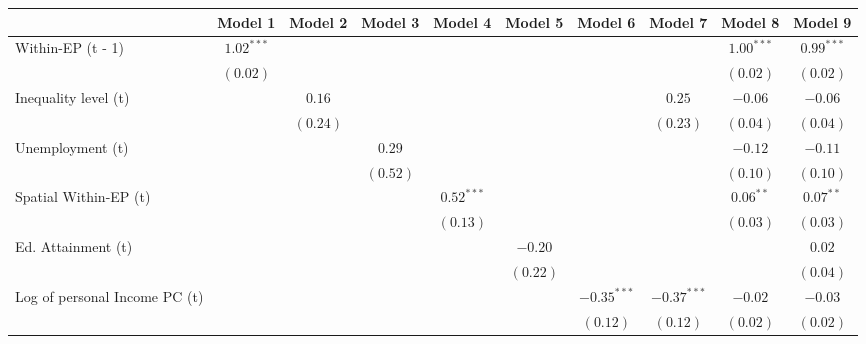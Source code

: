 
\begin{table}
\begin{center}
\begin{tabular}{l c c c c c c c c c}
\hline
 & Model 1 & Model 2 & Model 3 & Model 4 & Model 5 & Model 6 & Model 7 & Model 8 & Model 9 \\
\hline
Within-EP (t - 1)             & $1.02^{***}$ &          &          &              &          &               &               & $1.00^{***}$ & $0.99^{***}$ \\
                              & $(0.02)$     &          &          &              &          &               &               & $(0.02)$     & $(0.02)$     \\
Inequality level (t)          &              & $0.16$   &          &              &          &               & $0.25$        & $-0.06$      & $-0.06$      \\
                              &              & $(0.24)$ &          &              &          &               & $(0.23)$      & $(0.04)$     & $(0.04)$     \\
Unemployment (t)              &              &          & $0.29$   &              &          &               &               & $-0.12$      & $-0.11$      \\
                              &              &          & $(0.52)$ &              &          &               &               & $(0.10)$     & $(0.10)$     \\
Spatial Within-EP (t)         &              &          &          & $0.52^{***}$ &          &               &               & $0.06^{**}$  & $0.07^{**}$  \\
                              &              &          &          & $(0.13)$     &          &               &               & $(0.03)$     & $(0.03)$     \\
Ed. Attainment (t)            &              &          &          &              & $-0.20$  &               &               &              & $0.02$       \\
                              &              &          &          &              & $(0.22)$ &               &               &              & $(0.04)$     \\
Log of personal Income PC (t) &              &          &          &              &          & $-0.35^{***}$ & $-0.37^{***}$ & $-0.02$      & $-0.03$      \\
                              &              &          &          &              &          & $(0.12)$      & $(0.12)$      & $(0.02)$     & $(0.02)$     \\

\end{tabular}
\end{center}
\end{table}
